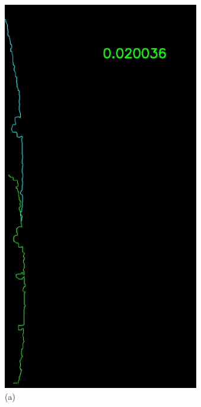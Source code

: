 \begin{figure}[h]
\begin{minipage}{0.24\textwidth}
        \caption*{(a)}
    \end{minipage}\hfill
    \begin{minipage}{0.24\textwidth}
        \centering
        \includegraphics[width=\textwidth]{images/stitching_middle.PNG} %

\end{minipage}
\end{figure}
